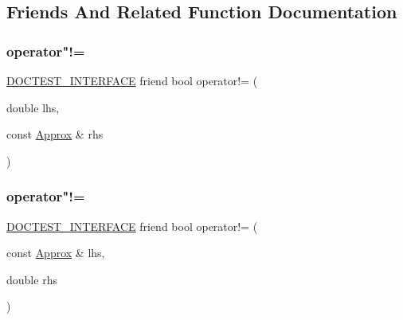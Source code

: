 \subsection{Friends And Related Function Documentation}
\mbox{\label{classdoctest_1_1_approx_a44d4bbc575291095c884848887538233}} 
\subsubsection{\texorpdfstring{operator"!=}{operator!=}\hspace{0.1cm}{\footnotesize\ttfamily [1/2]}}
{\footnotesize\ttfamily \hyperlink{doctest_8h_a9c16ffc635ec47f07797d21ede26b1a5}{D\+O\+C\+T\+E\+S\+T\+\_\+\+I\+N\+T\+E\+R\+F\+A\+CE} friend bool operator!= (\begin{DoxyParamCaption}\item[{double}]{lhs,  }\item[{const \hyperlink{classdoctest_1_1_approx}{Approx} \&}]{rhs }\end{DoxyParamCaption})\hspace{0.3cm}{\ttfamily [friend]}}

\mbox{\label{classdoctest_1_1_approx_ae86972ba14656f422afdcc60cd2cdb08}} 
\subsubsection{\texorpdfstring{operator"!=}{operator!=}\hspace{0.1cm}{\footnotesize\ttfamily [2/2]}}
{\footnotesize\ttfamily \hyperlink{doctest_8h_a9c16ffc635ec47f07797d21ede26b1a5}{D\+O\+C\+T\+E\+S\+T\+\_\+\+I\+N\+T\+E\+R\+F\+A\+CE} friend bool operator!= (\begin{DoxyParamCaption}\item[{const \hyperlink{classdoctest_1_1_approx}{Approx} \&}]{lhs,  }\item[{double}]{rhs }\end{DoxyParamCaption})\hspace{0.3cm}{\ttfamily [friend]}}

\mbox{\label{classdoctest_1_1_approx_acf32148e34dc6444a3bb4b16e7298279}} 
